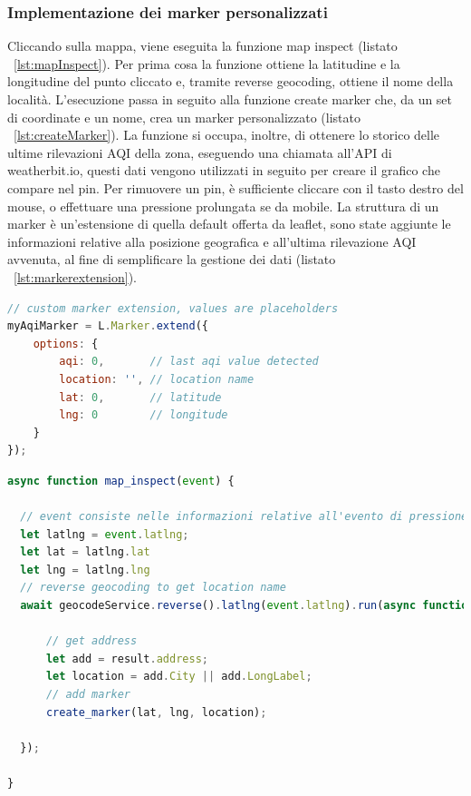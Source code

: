\subsubsection{Implementazione dei marker personalizzati}
Cliccando sulla mappa, viene eseguita la funzione map inspect (listato ~\ref{lst:mapInspect}).
Per prima cosa la funzione ottiene la latitudine e la longitudine del punto cliccato e, tramite reverse geocoding, ottiene il nome della località.
L'esecuzione passa in seguito alla funzione create marker che, da un set di coordinate e un nome, crea un marker personalizzato (listato ~\ref{lst:createMarker}).
La funzione si occupa, inoltre, di ottenere lo storico delle ultime rilevazioni AQI della zona, eseguendo una chiamata all'API di weatherbit.io, questi dati
vengono utilizzati in seguito per creare il grafico che compare nel pin.
Per rimuovere un pin, è sufficiente cliccare con il tasto destro del mouse, o effettuare una pressione prolungata se da mobile.
La struttura di un marker è un'estensione di quella default offerta da leaflet, sono state aggiunte le informazioni relative alla posizione geografica e all'ultima rilevazione AQI avvenuta, al fine di semplificare la gestione dei dati (listato ~\ref{lst:markerextension}).
\begin{lstlisting}[language=Javascript,caption={La struttura di un marker personalizzato.},label={lst:markerextension}]
// custom marker extension, values are placeholders
myAqiMarker = L.Marker.extend({
    options: {
        aqi: 0,       // last aqi value detected
        location: '', // location name
        lat: 0,       // latitude
        lng: 0        // longitude
    }
});
\end{lstlisting}

\begin{lstlisting}[language=Javascript,caption={La funzione map inspect.},label={lst:mapInspect}]
async function map_inspect(event) {

  // event consiste nelle informazioni relative all'evento di pressione sulla mappa
  let latlng = event.latlng;
  let lat = latlng.lat
  let lng = latlng.lng
  // reverse geocoding to get location name
  await geocodeService.reverse().latlng(event.latlng).run(async function (error, result) {

      // get address
      let add = result.address;
      let location = add.City || add.LongLabel;
      // add marker
      create_marker(lat, lng, location);

  });

}
\end{lstlisting}


